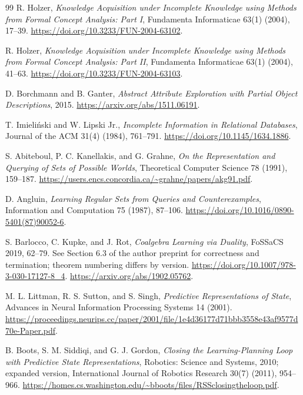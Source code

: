 \documentclass[11pt]{article}
\theoremstyle{definition}
\begin{document}
\begin{thebibliography}{99}
R. Holzer, \emph{Knowledge Acquisition under Incomplete Knowledge using
Methods from Formal Concept Analysis: Part I}, Fundamenta Informaticae
63(1) (2004), 17--39.
\url{https://doi.org/10.3233/FUN-2004-63102}.

R. Holzer, \emph{Knowledge Acquisition under Incomplete Knowledge using
Methods from Formal Concept Analysis: Part II}, Fundamenta Informaticae
63(1) (2004), 41--63.
\url{https://doi.org/10.3233/FUN-2004-63103}.

D. Borchmann and B. Ganter, \emph{Abstract Attribute Exploration with
Partial Object Descriptions}, 2015.
\url{https://arxiv.org/abs/1511.06191}.

T. Imieli\'nski and W. Lipski Jr., \emph{Incomplete Information in
Relational Databases}, Journal of the ACM 31(4) (1984), 761--791.
\url{https://doi.org/10.1145/1634.1886}.

S. Abiteboul, P. C. Kanellakis, and G. Grahne,
\emph{On the Representation and Querying of Sets of Possible Worlds},
Theoretical Computer Science 78 (1991), 159--187.
\url{https://users.encs.concordia.ca/~grahne/papers/akg91.pdf}.

D. Angluin, \emph{Learning Regular Sets from Queries and Counterexamples},
Information and Computation 75 (1987), 87--106.
\url{https://doi.org/10.1016/0890-5401(87)90052-6}.

S. Barlocco, C. Kupke, and J. Rot, \emph{Coalgebra Learning via Duality},
FoSSaCS 2019, 62--79. See Section 6.3 of the author preprint for
correctness and termination; theorem numbering differs by version.
\url{https://doi.org/10.1007/978-3-030-17127-8_4}.
\url{https://arxiv.org/abs/1902.05762}.

M. L. Littman, R. S. Sutton, and S. Singh,
\emph{Predictive Representations of State}, Advances in Neural Information
Processing Systems 14 (2001).
\url{https://proceedings.neurips.cc/paper/2001/file/1e4d36177d71bbb3558e43af9577d70e-Paper.pdf}.

B. Boots, S. M. Siddiqi, and G. J. Gordon,
\emph{Closing the Learning-Planning Loop with Predictive State
Representations}, Robotics: Science and Systems, 2010; expanded version,
International Journal of Robotics Research 30(7) (2011), 954--966.
\url{https://homes.cs.washington.edu/~bboots/files/RSSclosingtheloop.pdf}.


\end{thebibliography}
\end{document}
